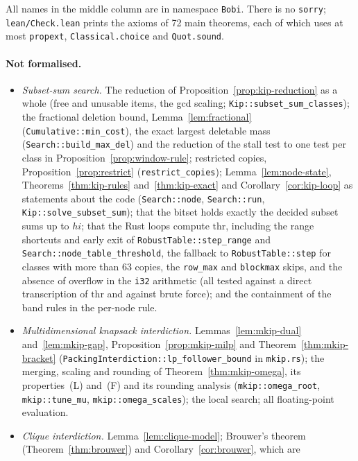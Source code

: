 All names in the middle column are in namespace \texttt{Bobi}. There is no
\texttt{sorry}; \texttt{lean/Check.lean} prints the axioms of 72 main
theorems, each of which uses at most \texttt{propext},
\texttt{Classical.choice} and \texttt{Quot.sound}.

\paragraph{Not formalised.}
{\raggedright
\begin{itemize}
\item \emph{Subset-sum search.} The reduction of
Proposition~\ref{prop:kip-reduction} as a whole (free and unusable items, the
gcd scaling; \texttt{Kip::subset\_sum\_classes}); the fractional deletion
bound, Lemma~\ref{lem:fractional} (\texttt{Cumulative::min\_cost}), the exact
largest deletable mass (\texttt{Search::build\_max\_del}) and the reduction of
the stall test to one test per class in Proposition~\ref{prop:window-rule};
restricted copies, Proposition~\ref{prop:restrict}
(\texttt{restrict\_copies}); Lemma~\ref{lem:node-state},
Theorems~\ref{thm:kip-rules} and~\ref{thm:kip-exact} and
Corollary~\ref{cor:kip-loop} as statements about the code
(\texttt{Search::node}, \texttt{Search::run}, \texttt{Kip::solve\_subset\_sum});
that the bitset holds exactly the decided subset sums up to $hi$; that the
Rust loops compute $\mathrm{thr}$, including the range shortcuts and early
exit of \texttt{RobustTable::step\_range} and \texttt{Search::node\_table\_threshold},
the fallback to \texttt{RobustTable::step} for classes with more than 63
copies, the \texttt{row\_max} and \texttt{blockmax} skips, and the absence of
overflow in the \texttt{i32} arithmetic (all tested against a direct
transcription of $\mathrm{thr}$ and against brute force); and the containment
of the band rules in the per-node rule.
\item \emph{Multidimensional knapsack interdiction.}
Lemmas~\ref{lem:mkip-dual} and~\ref{lem:mkip-gap},
Proposition~\ref{prop:mkip-milp} and Theorem~\ref{thm:mkip-bracket}
(\texttt{PackingInterdiction::lp\_follower\_bound} in \texttt{mkip.rs}); the
merging, scaling and rounding of Theorem~\ref{thm:mkip-omega}, its
properties~(L) and~(F) and its rounding analysis
(\texttt{mkip::omega\_root}, \texttt{mkip::tune\_mu},
\texttt{mkip::omega\_scales}); the local search; all floating-point
evaluation.
\item \emph{Clique interdiction.} Lemma~\ref{lem:clique-model}; Brouwer's
theorem (Theorem~\ref{thm:brouwer}) and Corollary~\ref{cor:brouwer}, which are

\end{itemize}}
